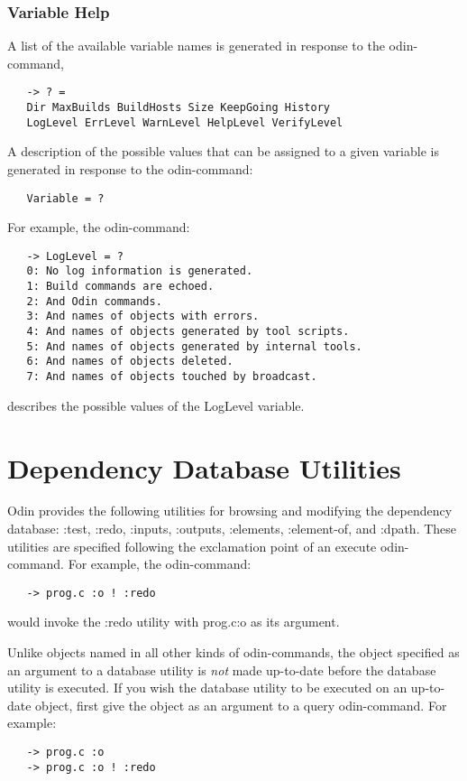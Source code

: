 \subsection{Variable Help}

A list of the available variable names is generated in response
to the odin-command,
\begin{verbatim}
   -> ? =
   Dir MaxBuilds BuildHosts Size KeepGoing History
   LogLevel ErrLevel WarnLevel HelpLevel VerifyLevel
\end{verbatim}
A description of the possible values that can be assigned to a
given variable is generated in response to the odin-command:
\begin{verbatim}
   Variable = ?
\end{verbatim}
For example, the odin-command:
\begin{verbatim}
   -> LogLevel = ?
   0: No log information is generated.
   1: Build commands are echoed.
   2: And Odin commands.
   3: And names of objects with errors.
   4: And names of objects generated by tool scripts.
   5: And names of objects generated by internal tools.
   6: And names of objects deleted.
   7: And names of objects touched by broadcast.
\end{verbatim}
describes the possible values of the {\ex LogLevel} variable.


\appendix


\chapter{Dependency Database Utilities}

Odin provides the following utilities for browsing and
modifying the dependency database:
{\ex :test}, {\ex :redo}, {\ex :inputs}, {\ex :outputs},
{\ex :elements}, {\ex :element-of}, and {\ex :dpath}.
These utilities are specified
following the exclamation point of an execute odin-command.
For example, the odin-command:
\begin{verbatim}
   -> prog.c :o ! :redo
\end{verbatim}
would invoke the {\ex :redo} utility with {\ex prog.c:o}
as its argument.

Unlike objects named in all other kinds of odin-commands,
the object specified as an argument to a database utility
is {\em not} made up-to-date before the database utility is executed.
If you wish the database utility to be executed on an up-to-date object,
first give the object as an argument to a query odin-command.
For example:
\begin{verbatim}
   -> prog.c :o
   -> prog.c :o ! :redo
\end{verbatim}

